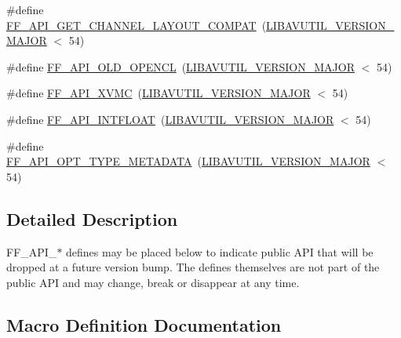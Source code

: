 \begin{DoxyCompactItemize}
\item 
\#define \hyperlink{group__depr__guards_ga8059f7443ac1e186b9cd86b5e2266b46}{F\+F\+\_\+\+A\+P\+I\+\_\+\+G\+E\+T\+\_\+\+C\+H\+A\+N\+N\+E\+L\+\_\+\+L\+A\+Y\+O\+U\+T\+\_\+\+C\+O\+M\+P\+AT}~(\hyperlink{group__lavu__ver_gaa29a3ad3376b8050d9ef4779045f745e}{L\+I\+B\+A\+V\+U\+T\+I\+L\+\_\+\+V\+E\+R\+S\+I\+O\+N\+\_\+\+M\+A\+J\+OR} $<$ 54)
\item 
\#define \hyperlink{group__depr__guards_gaf4ffffc2e7ca776de397305c8fe884cb}{F\+F\+\_\+\+A\+P\+I\+\_\+\+O\+L\+D\+\_\+\+O\+P\+E\+N\+CL}~(\hyperlink{group__lavu__ver_gaa29a3ad3376b8050d9ef4779045f745e}{L\+I\+B\+A\+V\+U\+T\+I\+L\+\_\+\+V\+E\+R\+S\+I\+O\+N\+\_\+\+M\+A\+J\+OR} $<$ 54)
\item 
\#define \hyperlink{group__depr__guards_ga0547810db3c87faf710788351d80aa22}{F\+F\+\_\+\+A\+P\+I\+\_\+\+X\+V\+MC}~(\hyperlink{group__lavu__ver_gaa29a3ad3376b8050d9ef4779045f745e}{L\+I\+B\+A\+V\+U\+T\+I\+L\+\_\+\+V\+E\+R\+S\+I\+O\+N\+\_\+\+M\+A\+J\+OR} $<$ 54)
\item 
\#define \hyperlink{group__depr__guards_ga3ae415b5e10d60b5ed1dc096df94f8a6}{F\+F\+\_\+\+A\+P\+I\+\_\+\+I\+N\+T\+F\+L\+O\+AT}~(\hyperlink{group__lavu__ver_gaa29a3ad3376b8050d9ef4779045f745e}{L\+I\+B\+A\+V\+U\+T\+I\+L\+\_\+\+V\+E\+R\+S\+I\+O\+N\+\_\+\+M\+A\+J\+OR} $<$ 54)
\item 
\#define \hyperlink{group__depr__guards_ga159400810452c45133a20bd0ba96da94}{F\+F\+\_\+\+A\+P\+I\+\_\+\+O\+P\+T\+\_\+\+T\+Y\+P\+E\+\_\+\+M\+E\+T\+A\+D\+A\+TA}~(\hyperlink{group__lavu__ver_gaa29a3ad3376b8050d9ef4779045f745e}{L\+I\+B\+A\+V\+U\+T\+I\+L\+\_\+\+V\+E\+R\+S\+I\+O\+N\+\_\+\+M\+A\+J\+OR} $<$ 54)
\end{DoxyCompactItemize}


\subsection{Detailed Description}
F\+F\+\_\+\+A\+P\+I\+\_\+$\ast$ defines may be placed below to indicate public A\+PI that will be dropped at a future version bump. The defines themselves are not part of the public A\+PI and may change, break or disappear at any time. 

\subsection{Macro Definition Documentation}
